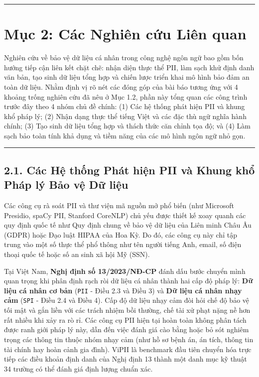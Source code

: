 \documentclass[
  11pt,
  a4paper,
]{article}
\begin{document}
\begin{center}\rule{0.5\linewidth}{0.5pt}\end{center}

\section{Mục 2: Các Nghiên cứu Liên quan}\label{mux1ee5c-2-cuxe1c-nghiuxean-cux1ee9u-liuxean-quan}

Nghiên cứu về bảo vệ dữ liệu cá nhân trong công nghệ ngôn ngữ bao gồm bốn hướng tiếp cận liên kết
chặt chẽ: nhận diện thực thể PII, làm sạch khử định danh văn bản, tạo sinh dữ liệu tổng hợp và chiến
lược triển khai mô hình bảo đảm an toàn dữ liệu. Nhằm định vị rõ nét các đóng góp của bài báo tương
ứng với 4 khoảng trống nghiên cứu đã nêu ở Mục 1.2, phần này tổng quan các công trình trước đây theo
4 nhóm chủ đề chính: (1) Các hệ thống phát hiện PII và khung khổ pháp lý; (2) Nhận dạng thực thể
tiếng Việt và các đặc thù ngữ nghĩa hành chính; (3) Tạo sinh dữ liệu tổng hợp và thách thức căn
chỉnh tọa độ; và (4) Làm sạch bảo toàn tính khả dụng và tiềm năng của các mô hình ngôn ngữ nhỏ gọn.

\begin{center}\rule{0.5\linewidth}{0.5pt}\end{center}

\subsection{2.1. Các Hệ thống Phát hiện PII và Khung khổ Pháp lý Bảo vệ Dữ
liệu}\label{cuxe1c-hux1ec7-thux1ed1ng-phuxe1t-hiux1ec7n-pii-vuxe0-khung-khux1ed5-phuxe1p-luxfd-bux1ea3o-vux1ec7-dux1eef-liux1ec7u}

Các công cụ rà soát PII và thư viện mã nguồn mở phổ biến (như Microsoft Presidio, spaCy PII,
Stanford CoreNLP) chủ yếu được thiết kế xoay quanh các quy định quốc tế như Quy định chung về bảo vệ
dữ liệu của Liên minh Châu Âu (GDPR) hoặc Đạo luật HIPAA của Hoa Kỳ. Do đó, các công cụ này chỉ tập
trung vào một số thực thể phổ thông như tên người tiếng Anh, email, số điện thoại quốc tế hoặc số an
sinh xã hội Mỹ (SSN).

Tại Việt Nam, \textbf{Nghị định số 13/2023/NĐ-CP} đánh dấu bước chuyển mình quan trọng khi phân định
rạch ròi dữ liệu cá nhân thành hai cấp độ pháp lý: \textbf{Dữ liệu cá nhân cơ bản} (\texttt{PII} -
Điều 2.3 và Điều 3) và \textbf{Dữ liệu cá nhân nhạy cảm} (\texttt{SPI} - Điều 2.4 và Điều 4). Cấp độ
dữ liệu nhạy cảm đòi hỏi chế độ bảo vệ tối mật và gắn liền với các trách nhiệm bồi thường, chế tài
xử phạt nặng nề hơn rất nhiều khi xảy ra rò rỉ. Các công cụ PII hiện tại hoàn toàn không phân tách
được ranh giới pháp lý này, dẫn đến việc đánh giá cào bằng hoặc bỏ sót nghiêm trọng các thông tin
thuộc nhóm nhạy cảm (như hồ sơ bệnh án, án tích, thông tin tài chính hay hoàn cảnh gia đình). ViPII
là benchmark đầu tiên chuyển hóa trực tiếp các điều khoản định danh của Nghị định 13 thành một danh
mục kỹ thuật 34 trường có thể đánh giá định lượng chuẩn xác.
\end{document}
